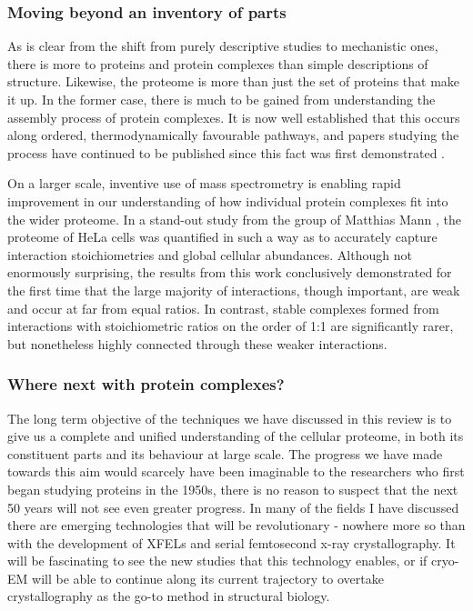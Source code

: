 \documentclass[a4paper,11pt,twoside,openright]{scrbook}
\begin{document}
\subsubsection{Moving beyond an inventory of parts}
As is clear from the shift from purely descriptive studies to mechanistic ones, there is more to proteins and protein complexes than simple descriptions of structure. Likewise, the proteome is more than just the set of proteins that make it up. In the former case, there is much to be gained from understanding the assembly process of protein complexes. It is now well established that this occurs along ordered, thermodynamically favourable pathways, and papers studying the process have continued to be published since this fact was first demonstrated \cite{Levy2008a,Marsh2013,Appolaire2014,Macek2017,Mallik2017}.

On a larger scale, inventive use of mass spectrometry is enabling rapid improvement in our understanding of how individual protein complexes fit into the wider proteome. In a stand-out study from the group of Matthias Mann \cite{Hein2015}, the proteome of HeLa cells was quantified in such a way as to accurately capture interaction stoichiometries and global cellular abundances. Although not enormously surprising, the results from this work conclusively demonstrated for the first time that the large majority of interactions, though important, are weak and occur at far from equal ratios. In contrast, stable complexes formed from interactions with stoichiometric ratios on the order of 1:1 are significantly rarer, but nonetheless highly connected through these weaker interactions.

\subsubsection{Where next with protein complexes?}
The long term objective of the techniques we have discussed in this review is to give us a complete and unified understanding of the cellular proteome, in both its constituent parts and its behaviour at large scale. The progress we have made towards this aim would scarcely have been imaginable to the researchers who first began studying proteins in the 1950s, there is no reason to suspect that the next 50 years will not see even greater progress. In many of the fields I have discussed there are emerging technologies that will be revolutionary - nowhere more so than with the development of XFELs and serial femtosecond x-ray crystallography. It will be fascinating to see the new studies that this technology enables, or if cryo-EM will be able to continue along its current trajectory to overtake crystallography as the go-to method in structural biology.
\end{document}
